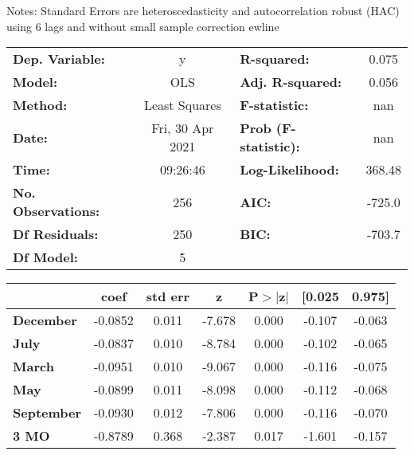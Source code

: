 Notes: \newline
 [1] Standard Errors are heteroscedasticity and autocorrelation robust (HAC) using 6 lags and without small sample correction
ewline\begin{center}
\begin{tabular}{lclc}
\toprule
\textbf{Dep. Variable:}    &        y         & \textbf{  R-squared:         } &     0.075   \\
\textbf{Model:}            &       OLS        & \textbf{  Adj. R-squared:    } &     0.056   \\
\textbf{Method:}           &  Least Squares   & \textbf{  F-statistic:       } &       nan   \\
\textbf{Date:}             & Fri, 30 Apr 2021 & \textbf{  Prob (F-statistic):} &      nan    \\
\textbf{Time:}             &     09:26:46     & \textbf{  Log-Likelihood:    } &    368.48   \\
\textbf{No. Observations:} &         256      & \textbf{  AIC:               } &    -725.0   \\
\textbf{Df Residuals:}     &         250      & \textbf{  BIC:               } &    -703.7   \\
\textbf{Df Model:}         &           5      & \textbf{                     } &             \\
\bottomrule
\end{tabular}
\begin{tabular}{lcccccc}
                   & \textbf{coef} & \textbf{std err} & \textbf{z} & \textbf{P$> |$z$|$} & \textbf{[0.025} & \textbf{0.975]}  \\
\midrule
\textbf{December}  &      -0.0852  &        0.011     &    -7.678  &         0.000        &       -0.107    &       -0.063     \\
\textbf{July}      &      -0.0837  &        0.010     &    -8.784  &         0.000        &       -0.102    &       -0.065     \\
\textbf{March}     &      -0.0951  &        0.010     &    -9.067  &         0.000        &       -0.116    &       -0.075     \\
\textbf{May}       &      -0.0899  &        0.011     &    -8.098  &         0.000        &       -0.112    &       -0.068     \\
\textbf{September} &      -0.0930  &        0.012     &    -7.806  &         0.000        &       -0.116    &       -0.070     \\
\textbf{3 MO}      &      -0.8789  &        0.368     &    -2.387  &         0.017        &       -1.601    &       -0.157     \\

\end{tabular}
\end{center}
